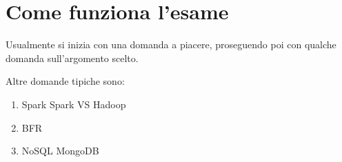 \documentclass[\main/main.tex]{subfiles}
\begin{document}
\chapter{Come funziona l'esame}
Usualmente si inizia con una domanda a piacere, proseguendo poi con qualche domanda sull'argomento scelto.

Altre domande tipiche sono:
\begin{enumerate}
  \item Spark
        \subitem Spark VS Hadoop
  \item BFR
  \item NoSQL
        \subitem MongoDB
\end{enumerate}
\end{document}
